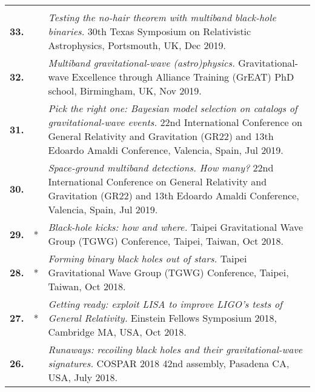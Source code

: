 \documentclass[a4paper]{moderncv}
\begin{document}
{\begin{longtable}{rp{0.4cm}p{15.8cm}}
\vspace{0.05cm}\\
%
\textbf{33.} & & \textit{Testing the no-hair theorem with multiband black-hole binaries.}
\newline{}30th Texas Symposium on Relativistic Astrophysics, Portsmouth, UK, Dec 2019.
\vspace{0.05cm}\\
%
\textbf{32.} & & \textit{Multiband gravitational-wave (astro)physics.}
\newline{} Gravitational-wave Excellence through Alliance Training (GrEAT) PhD school, Birmingham, UK, Nov 2019.
\vspace{0.05cm}\\
%
\textbf{31.} & & \textit{Pick the right one: Bayesian model selection on catalogs of gravitational-wave events.}
\newline{} 22nd International Conference on General Relativity and Gravitation (GR22)  and 13th Edoardo Amaldi Conference, Valencia, Spain, Jul 2019.
\vspace{0.05cm}\\
%
\textbf{30.} & & \textit{Space-ground multiband detections. How many?}
\newline{} 22nd International Conference on General Relativity and Gravitation (GR22)  and 13th Edoardo Amaldi Conference, Valencia, Spain, Jul 2019.
\vspace{0.05cm}\\
%
\textbf{29.} & * & \textit{Black-hole kicks: how and where.}
\newline{} Taipei Gravitational Wave Group (TGWG) Conference, Taipei, Taiwan, Oct 2018.
\vspace{0.05cm}\\
%
\textbf{28.} & * & \textit{Forming binary black holes out of stars.}
\newline{} Taipei Gravitational Wave Group (TGWG) Conference, Taipei, Taiwan, Oct 2018.
\vspace{0.05cm}\\
%
\textbf{27.} & * & \textit{Getting ready: exploit LISA to improve LIGO's tests of General Relativity.}
\newline{} Einstein Fellows Symposium 2018, Cambridge MA, USA, Oct 2018.
\vspace{0.05cm}\\
%
\textbf{26.} & & \textit{Runaways: recoiling black holes and their gravitational-wave signatures.}
\newline{} COSPAR 2018 42nd assembly, Pasadena CA, USA, July 2018.

\end{longtable}}
\end{document}
